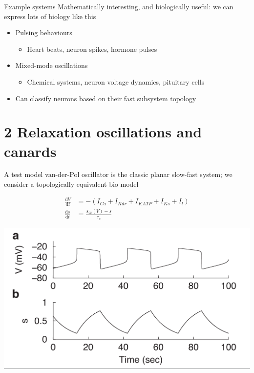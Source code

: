 \documentclass[presentation]{beamer}
\begin{document}
\begin{frame}[label={sec:orgedf5ed7}]{Example systems}
Mathematically interesting, and biologically useful: we can express lots of biology like this
\vfill
\begin{itemize}
\item Pulsing behaviours
\begin{itemize}
\item Heart beats, neuron spikes, hormone pulses
\end{itemize}
\end{itemize}
\vfill
\begin{itemize}
\item Mixed-mode oscillations
\begin{itemize}
\item Chemical systems, neuron voltage dynamics, pituitary cells
\end{itemize}
\end{itemize}
\vfill
\begin{itemize}
\item Can classify neurons based on their fast subsystem topology
\end{itemize}
\end{frame}

\section{2 Relaxation oscillations and canards}
\label{sec:org064e600}
\begin{frame}[label={sec:org58ee1bd},plain]{A test model}
van-der-Pol oscillator is the classic planar slow-fast system; we consider a topologically equivalent bio model

\begin{align}
\frac{\mathrm{d}V}{\mathrm{d}t} &= -(I_{Ca} + I_{Kdr} + I_{KATP} + I_{Ks} + I_l) \\ \nonumber
\frac{\mathrm{d}s}{\mathrm{d}t} &= \frac{s_\infty(V) - s}{\tau_s}
\end{align}

\begin{center}
\includegraphics[width=.7\textwidth]{./dynamics.png}
\end{center}
\end{frame}
\end{document}
